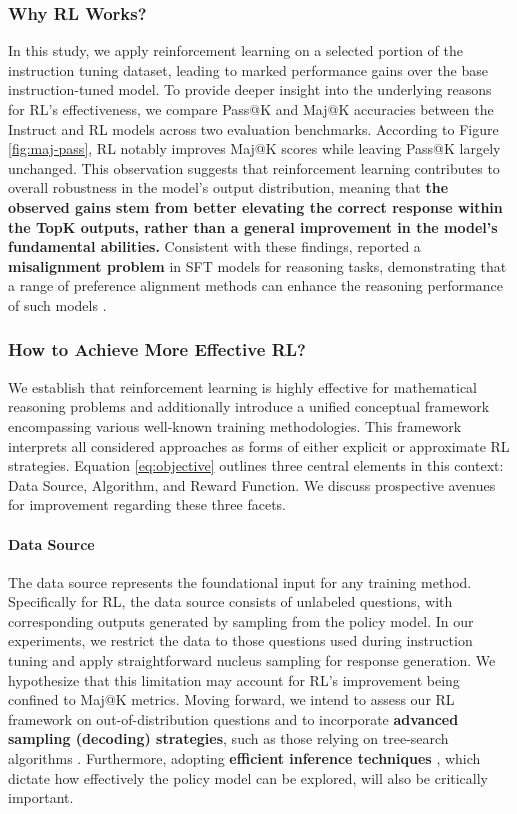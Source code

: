 \subsubsection{Why RL Works?}  
In this study, we apply reinforcement learning on a selected portion of the instruction tuning dataset, leading to marked performance gains over the base instruction-tuned model. To provide deeper insight into the underlying reasons for RL's effectiveness, we compare Pass@K and Maj@K accuracies between the Instruct and RL models across two evaluation benchmarks. According to Figure \ref{fig:maj-pass}, RL notably improves Maj@K scores while leaving Pass@K largely unchanged. This observation suggests that reinforcement learning contributes to overall robustness in the model's output distribution, meaning that \textbf{the observed gains stem from better elevating the correct response within the TopK outputs, rather than a general improvement in the model’s fundamental abilities.} Consistent with these findings, \citep{wang2023making} reported a \textbf{misalignment problem} in SFT models for reasoning tasks, demonstrating that a range of preference alignment methods can enhance the reasoning performance of such models \citep{yuan2023rrhf,song2023preference,wang2023making}.

\subsubsection{How to Achieve More Effective RL?}
\label{sec:effec_rl}
We establish that reinforcement learning is highly effective for mathematical reasoning problems and additionally introduce a unified conceptual framework encompassing various well-known training methodologies. This framework interprets all considered approaches as forms of either explicit or approximate RL strategies. Equation \ref{eq:objective} outlines three central elements in this context: Data Source, Algorithm, and Reward Function. We discuss prospective avenues for improvement regarding these three facets.

\paragraph{Data Source}  
The data source represents the foundational input for any training method. Specifically for RL, the data source consists of unlabeled questions, with corresponding outputs generated by sampling from the policy model. In our experiments, we restrict the data to those questions used during instruction tuning and apply straightforward nucleus sampling for response generation. We hypothesize that this limitation may account for RL’s improvement being confined to Maj@K metrics. Moving forward, we intend to assess our RL framework on out-of-distribution questions and to incorporate \textbf{advanced sampling (decoding) strategies}, such as those relying on tree-search algorithms \citep{yao2023tree}. Furthermore, adopting \textbf{efficient inference techniques} \citep{xia-etal-2023-speculative,leviathan2023fast,kwon2023efficient,xia2024unlocking}, which dictate how effectively the policy model can be explored, will also be critically important.


